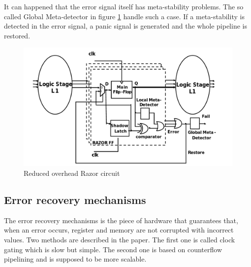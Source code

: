 \documentclass[fleqn,envcountsame,runningheads,10pt,a4paper]{llncs}
\begin{document}
It can happened that the error signal itself has meta-stability problems. The so called Global Meta-detector in figure \ref{figure3} handle such a case. If a meta-stability is detected in the error signal, a panic signal is generated and the whole pipeline is restored. 
\begin{figure}[!h]
    \centering
   \centerline{\includegraphics[scale=0.25]{./img/figure3.png}}
   \caption{\label{figure3}Reduced overhead Razor circuit\cite{Barthou:1998}}
\end{figure}

\subsection{Error recovery mechanisms}
\label{ERM}
The error recovery mechanisms is the piece of hardware that guarantees that, when an error occurs, register and memory are not corrupted with incorrect values. Two methods are described in the paper. The first one is called clock gating which is slow but simple. The second one is based on counterflow pipelining and is supposed to be more scalable.
\end{document}
